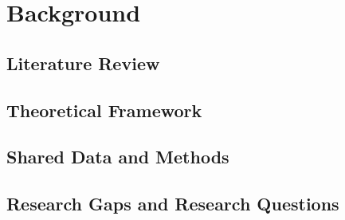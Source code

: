 \chapter{Background}
\label{ch:background}


\section{Literature Review}
\label{sec:background-literature}
\mbox{}\par

\section{Theoretical Framework}
\label{sec:background-framework}
\mbox{}\par

\section{Shared Data and Methods}
\label{sec:background-methods}
\mbox{}\par

\section{Research Gaps and Research Questions}
\label{sec:background-gaps}
\mbox{}\par
